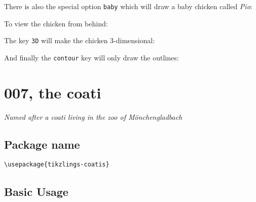 \documentclass[parskip=half]{scrartcl}
\begin{document}
\begin{tcblisting}{}
\chicken[feet=red]
\end{tcblisting}

There is also the special option \lstinline|baby| which will draw a baby chicken called \emph{Pio}:
\begin{tcblisting}{}
\chicken[baby=yellow]
\end{tcblisting}

To view the chicken from behind:
\begin{tcblisting}{}
\chicken[back]
\end{tcblisting}

The key \lstinline|3D| will make the chicken 3-dimensional:
\begin{tcblisting}{}
\chicken[3D]
\end{tcblisting}

And finally the \lstinline|contour| key will only draw the outlines:
\begin{tcblisting}{}
\chicken[contour=black]
\end{tcblisting}

%
%
\clearpage
\section[Coati]{007, the coati}

\emph{Named after a coati living in the zoo of M\"onchengladbach}

\subsection{Package name}

\begin{tcolorbox}[lower separated=false, lefthand width=.8\linewidth]
\vspace*{0.5cm}
\lstinline|\usepackage{tikzlings-coatis}| 
\vspace*{0.5cm}
\end{tcolorbox}

\subsection{Basic Usage}

\begin{tcblisting}{}
\coati
\end{tcblisting}
\end{document}
